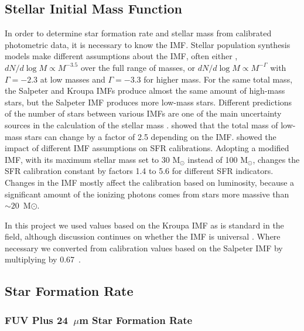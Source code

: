 \subsection{Stellar Initial Mass Function}
\label{sec: imf}
In order to determine star formation rate and stellar mass from calibrated photometric data, it is necessary to know the IMF. 
Stellar population synthesis models make different assumptions about the IMF, often either \citet{Salpeter55},
$ dN / d \log M \propto M^{-3.5 }$ over the full range of masses, or 
\citet{Kroupa01} $ dN / d \log M \propto M^{-\Gamma }$ 
with $\Gamma=-2.3$ at low masses and  $\Gamma=-3.3$ for higher mass.
For the same total mass, the Salpeter and Kroupa IMFs produce almost the same amount of high-mass stars, but the Salpeter IMF produces more low-mass stars. Different predictions of the number of stars between various IMFs are one of the main uncertainty sources in the calculation of the stellar mass \citep{Eskew12,Brewer12}. \citet{Eskew12} showed that the total mass of low-mass stars can change by a factor of 2.5 depending on the IMF.
\citet{Calzetti13} showed the impact of different IMF assumptions on SFR calibrations. Adopting a modified \citet{Kroupa01} IMF, with its maximum stellar mass set to 30 M$_{\odot}$ instead of 100 M$_{\odot}$, changes the SFR calibration constant by factors 1.4 to 5.6 for different SFR indicators. Changes in the IMF mostly affect the calibration based on \halpha luminosity, because a significant amount of the ionizing photons comes from stars more massive than $\sim 20$~M$\odot$.

In this project we used values based on the Kroupa IMF as is standard in the field, although discussion continues on whether the IMF is universal \citep{Bastin10}. Where necessary we converted from calibration values based on the Salpeter IMF by multiplying by 0.67~\citep{Madau14}.



\subsection{Star Formation Rate}
\label{sec:sfr}
\subsubsection{FUV Plus 24~$\mu$m Star Formation Rate}

